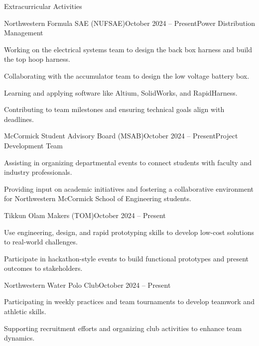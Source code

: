 \documentclass[
	a4paper, %
	10pt, %
]{resume} %
\begin{document}
\begin{rSection}{Extracurricular Activities}

    \begin{rSubsection}{Northwestern Formula SAE (NUFSAE)}{October 2024 -- Present}{Power Distribution Management}{}{}
    	\item Working on the electrical systems team to design the back box harness and build the top hoop harness.
    	        	\item Collaborating with the accumulator team to design the low voltage battery box.
        	\item Learning and applying software like Altium, SolidWorks, and RapidHarness.
        	\item Contributing to team milestones and ensuring technical goals align with deadlines.
    \end{rSubsection}

    \begin{rSubsection}{McCormick Student Advisory Board (MSAB)}{October 2024 -- Present}{Project Development Team}{}{}
        	\item Assisting in organizing departmental events to connect students with faculty and industry professionals.
        	\item Providing input on academic initiatives and fostering a collaborative environment for Northwestern McCormick School of Engineering  students.
    \end{rSubsection}

    \begin{rSubsection}{Tikkun Olam Makers (TOM)}{October 2024 -- Present}{}{}
        	\item Use engineering, design, and rapid prototyping skills to develop low-cost solutions to real-world challenges.
        	\item Participate in hackathon-style events to build functional prototypes and present outcomes to stakeholders.
    \end{rSubsection}

    \begin{rSubsection}{Northwestern Water Polo Club}{October 2024 -- Present}{}{}
        	\item Participating in weekly practices and team tournaments to develop teamwork and athletic skills.
        	\item Supporting recruitment efforts and organizing club activities to enhance team dynamics.
    \end{rSubsection}

\end{rSection}
\end{document}
